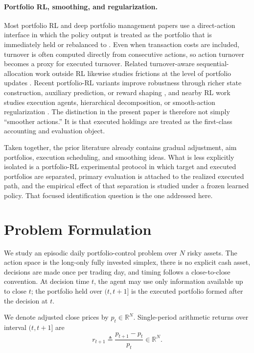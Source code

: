 \documentclass[10pt,twocolumn]{article}
\newcommand{\R}{\mathbb{R}}
\begin{document}
\paragraph{Portfolio RL, smoothing, and regularization.}
Most portfolio RL and deep portfolio management papers use a direct-action interface in which the policy output is treated as the portfolio that is immediately held or rebalanced to \cite{moody1998,jiang2017,ye2020}. Even when transaction costs are included, turnover is often computed directly from consecutive actions, so action turnover becomes a proxy for executed turnover. Related turnover-aware sequential-allocation work outside RL likewise studies frictions at the level of portfolio updates \cite{li2014}. Recent portfolio-RL variants improve robustness through richer state construction, auxiliary prediction, or reward shaping \cite{ye2020,lien2023}, and nearby RL work studies execution agents, hierarchical decomposition, or smooth-action regularization \cite{nevmyvaka2006,wang2021hrpm,shen2020,mysore2021}. The distinction in the present paper is therefore not simply ``smoother actions.'' It is that executed holdings are treated as the first-class accounting and evaluation object.

Taken together, the prior literature already contains gradual adjustment, aim portfolios, execution scheduling, and smoothing ideas. What is less explicitly isolated is a portfolio-RL experimental protocol in which target and executed portfolios are separated, primary evaluation is attached to the realized executed path, and the empirical effect of that separation is studied under a frozen learned policy. That focused identification question is the one addressed here.

\section{Problem Formulation}
\label{sec:setup}
We study an episodic daily portfolio-control problem over $N$ risky assets. The action space is the long-only fully invested simplex, there is no explicit cash asset, decisions are made once per trading day, and timing follows a close-to-close convention. At decision time $t$, the agent may use only information available up to close $t$; the portfolio held over $(t,t{+}1]$ is the executed portfolio formed after the decision at $t$.

We denote adjusted close prices by $p_t\in\R^N$. Single-period arithmetic returns over interval $(t,t{+}1]$ are
\[
r_{t+1} \triangleq \frac{p_{t+1}-p_t}{p_t}\in\R^N.
\]
\end{document}

